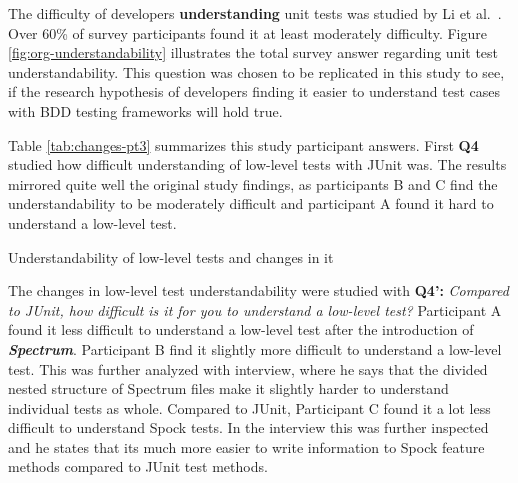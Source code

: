 The difficulty of developers \textbf{understanding} unit tests was studied by Li et al.~\cite{li2016automatically}. Over 60\% of survey
participants found it at least moderately difficulty. Figure \ref{fig:org-understandability} illustrates the total survey
answer regarding unit test understandability. This question was chosen to be replicated in this study to see, if the research
hypothesis of developers finding it easier to understand test cases with BDD testing frameworks will hold true.

Table \ref{tab:changes-pt3} summarizes this study participant answers. First \textbf{Q4} studied how difficult understanding
of low-level tests with JUnit was. The results mirrored quite well the original study findings, as participants B and C
find the understandability to be moderately difficult and participant A found it hard to understand a low-level test.


    \begin{table}[H]
            \caption {Understandability of low-level tests and changes in it} \label{tab:changes-pt3}
    \end{table}

The changes in low-level test understandability were studied with \textbf{Q4':} \textit{Compared to JUnit, how difficult is it
for you to understand a low-level test?} Participant A found it less difficult to understand a low-level
test after the introduction of \textbf{\textit{Spectrum}}. Participant B find it slightly more difficult to understand
a low-level test. This was further analyzed with interview, where he says that the divided nested structure of Spectrum
files make it slightly harder to understand individual tests as whole. Compared to JUnit, Participant C found it a lot less difficult to
understand Spock tests. In the interview this was further inspected and he states that its much more easier to write
information to Spock feature methods compared to JUnit test methods.

